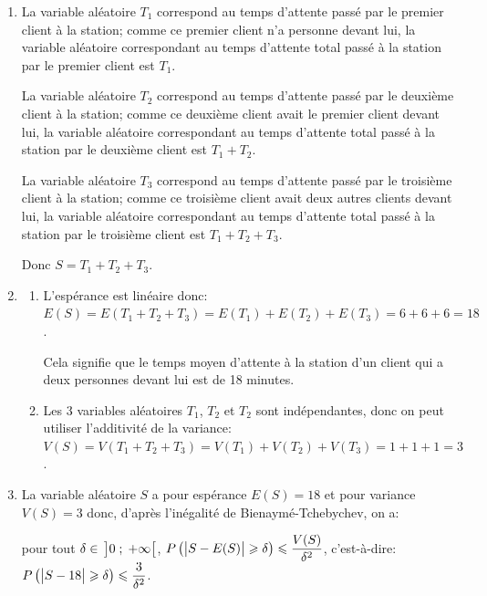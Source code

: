 \documentclass[10pt]{article}
\begin{document}
\begin{enumerate}
\item
La variable aléatoire $T_1$ correspond au temps d'attente passé par le premier client à la station; comme ce premier client n'a personne devant lui, la variable aléatoire correspondant au temps d'attente total passé à la station par le premier client est $T_1$.

La variable aléatoire $T_2$ correspond au temps d'attente passé par le deuxième client à la station; comme ce deuxième client avait le premier client devant lui, la variable aléatoire correspondant au temps d'attente total passé à la station par le deuxième client est $T_1+T_2$.

La variable aléatoire $T_3$ correspond au temps d'attente passé par le troisième client à la station; comme ce troisième client avait deux autres clients devant lui, la variable aléatoire correspondant au temps d'attente total passé à la station par le troisième client est $T_1+T_2+T_3$.

Donc $S=T_1+T_2+T_3$.

\item 
	\begin{enumerate}
		\item 
L'espérance est linéaire donc:\\
$E(S)=E\left (T_1+T_2+T_3\right ) = E\left (T_1\right )+ E\left (T_2\right )+ E\left (T_3\right ) =6+6+6=18$.

Cela signifie que le temps moyen d'attente à la station d'un client qui a deux personnes devant lui est de 18 minutes.
		
		\item 
Les 3 variables aléatoires $T_1$, $T_2$ et $T_2$ sont indépendantes, donc on peut utiliser l'additivité de la variance:\\
$V(S)=V\left (T_1+T_2+T_3\right ) = V\left (T_1\right )+ V\left (T_2\right )+ V\left (T_3\right ) =1+1+1=3$.
	\end{enumerate}
	
\item
La variable aléatoire $S$ a pour espérance $E(S)=18$ et pour variance $V(S)=3$ donc, d'après l'inégalité de Bienaymé-Tchebychev, on a:

pour tout $\delta\in\, \left ]0\;;\;+\infty\strut \right [$, $P\left ( \left |S-E(S)\strut \right | \geqslant \delta \right ) \leqslant \dfrac{V(S)}{\delta^2}$,
c'est-à-dire: $P\left ( \left |S-18\strut \right | \geqslant \delta \right ) \leqslant \dfrac{3}{\delta^2}$.


\end{enumerate}
\end{document}
